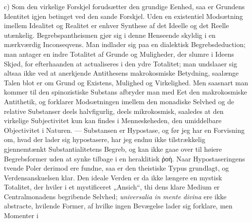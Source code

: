 \documentclass[12pt]{book}
\newcommand{\opage}[1]{\marginnote{\footnotesize\textit{[#1]}}}
\begin{document}
c) Som den virkelige Forskjel forudsætter den grundige Eenhed, saa er Grundens Identitet
igjen betinget ved den sande Forskjel. Uden en existentiel Modsætning imellem Idealitet og
Realitet er enhver Synthese af det Ideelle og det Reelle utænkelig. Begrebspantheismen
gjør sig i denne Henseende skyldig i en mærkværdig Inconseqvens. Man indlader sig paa en
dialektisk Begrebsdeduction; man antager en indre Totalitet af Grunde og Muligheder, der
slumre i Ideens Skjød, for efterhaanden at actualiseres i den ydre Totalitet; man
undslaaer sig altsaa ikke ved at anerkjende Antithesens makrokosmiske Betydning, saalænge
Talen blot er om Grund og Existens, Mulighed og Virkelighed. Men saasnart man kommer til
den spinozistiske Substans afbryder man med Eet den makrokosmiske Antithetik, og forklarer
Modsætningen imellem den monadiske Selvhed og de relative Substanser deels halvfigurlig,
deels mikrokosmisk, saaledes at den virkelige Subjectivitet kun kan findes i
Menneskeheden, den umiddelbare Objectivitet i Naturen. --- Substansen er Hypostase, og før
jeg har en Forvisning om, hvad der lader sig hypostasere, har jeg endnu ikke tilstrækkelig
gjennemtænkt Substantialitetens Begreb, og kan ikke gaae over til høiere Begrebsformer
uden at synke tilbage i en heraklitisk ῥοὴ. Naar Hypostaseringens tvende Poler derimod ere
fundne, saa er den theistiske Typus grundlagt, og Verdensanskuelsen klar. Den ideale
Verden er da ikke længere en mystisk Totalitet, der hviler i et mystificeret „Ansich“, thi
dens klare Medium er Centralmonadens begribende Selvhed; \textit{universalia in mente
divina} ere ikke abstracte, hvilende Former, af hvilke ingen Bevægelse lader sig forklare,
men Momenter i
\opage{198} %
\end{document}

